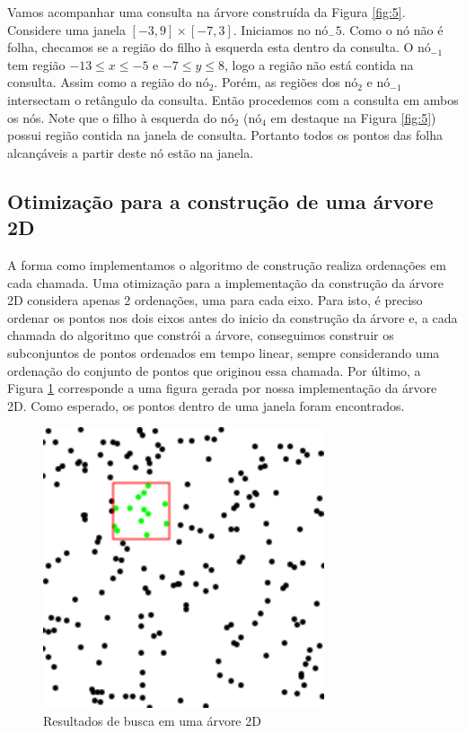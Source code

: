 Vamos acompanhar uma consulta na árvore construída da Figura \ref{fig:5}. Considere uma janela $[-3, 9]\times[-7, 3]$. %
Iniciamos no nó$_-5$. Como o nó não é folha, checamos se a região do filho à esquerda esta dentro da consulta. O $\mbox{nó}_{-1}$ tem região $ -13 \leq x \leq -5 $ e  $ -7 \leq y \leq 8$, logo a região não está contida na consulta. Assim como a região do nó$_2$. Porém, as regiões dos $\mbox{nó}_2$ e $\mbox{nó}_{-1}$ intersectam o retângulo da consulta. Então procedemos com a consulta em ambos os nós. %
Note que o filho à esquerda do $\mbox{nó}_{2}$ ($\mbox{nó}_4$ em destaque na Figura \ref{fig:5}) possui região contida na janela de consulta. Portanto todos os pontos das folha alcançáveis a partir deste nó estão na janela. 

\subsection{Otimização para a construção de uma árvore 2D}
A forma como implementamos o algoritmo de construção realiza ordenações em cada chamada.
Uma otimização para a implementação da construção da árvore 2D considera apenas 2 ordenações, uma para cada eixo. %
Para isto, é preciso ordenar os pontos nos dois eixos antes do inicio da construção da árvore e, a cada chamada do algoritmo que constrói a árvore, conseguimos construir os subconjuntos de pontos ordenados em tempo linear, sempre considerando uma ordenação do conjunto de pontos que originou essa chamada. %
Por último, a Figura \ref{fig:7} corresponde a uma figura gerada por nossa implementação da árvore 2D. Como esperado, os pontos dentro de uma janela foram encontrados.
\begin{figure}[ht!]
    \begin{center}
        \includegraphics{images/points.pdf}
    \end{center}
    \caption {Resultados de busca em uma árvore 2D}
    \label{fig:7}
\end{figure}



